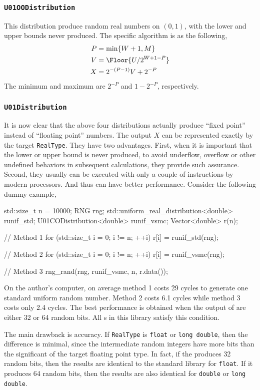 \subsubsection{\texttt{U01OODistribution}}

This distribution produce random real numbers on $(0, 1)$, with the lower and
upper bounds never produced. The specific algorithm is as the following,
\begin{align*}
  P &= \min\{W + 1, M\} \\
  V &= \Floor{U / 2^{W + 1 - P}} \\
  X &= 2^{-(P - 1)} V + 2^{-P}
\end{align*}
The minimum and maximum are $2^{-P}$ and $1 - 2^{-P}$, respectively.

\subsubsection{\texttt{U01Distribution}}

It is now clear that the above four distributions actually produce ``fixed
point'' instead of ``floating point'' numbers. The output $X$ can be
represented exactly by the target \verb|RealType|. They have two advantages.
First, when it is important that the lower or upper bound is never produced, to
avoid underflow, overflow or other undefined behaviors in subsequent
calculations, they provide such assurance. Second, they usually can be executed
with only a couple of instructions by modern processors. And thus can have
better performance. Consider the following dummy example,
\begin{cppcode}
  std::size_t n = 10000;
  RNG rng;
  std::uniform_real_distribution<double> runif_std;
  U01CODistribution<double> runif_vsmc;
  Vector<double> r(n);

  // Method 1
  for (std::size_t i = 0; i != n; ++i)
      r[i] = runif_std(rng);

  // Method 2
  for (std::size_t i = 0; i != n; ++i)
      r[i] = runif_vsmc(rng);

  // Method 3
  rng_rand(rng, runif_vsmc, n, r.data());
\end{cppcode}
On the author's computer, on average method 1 costs 29 cycles to generate one
standard uniform random number. Method 2 costs 6.1 cycles while method 3 costs
only 2.4 cycles. The best performance is obtained when the output of \rng are
either 32 or 64 random bits. All \rng{}s in this library satisfy this
condition.

The main drawback is accuracy. If \verb|RealType| is \verb|float| or
\verb|long double|, then the difference is minimal, since the intermediate
random integers have more bits than the significant of the target floating
point type. In fact, if the \rng produces 32 random bits, then the results are
identical to the standard library for \verb|float|. If it produces 64 random
bits, then the results are also identical for \verb|double| or
\verb|long double|.

